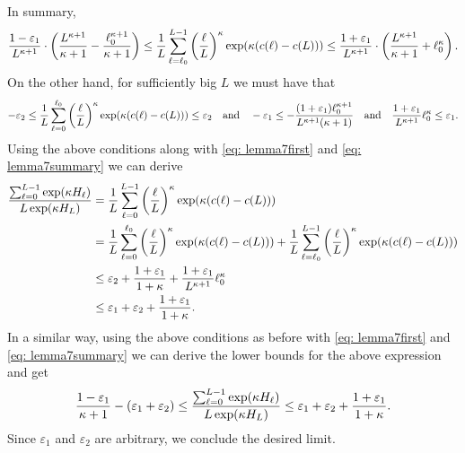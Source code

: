     In summary, 
    \begin{equation}
        \label{eq: lemma7summary}
        \frac{1-\varepsilon_1}{L^{\kappa + 1}} \cdot \left( \frac{L^{\kappa + 1}}{\kappa + 1} - \frac{\ell_0^{\kappa+1}}{\kappa+1} \right) \leq \frac{1}{L} \sum_{\ell= \ell_0}^{L-1} \left(\frac{\ell}{L}\right)^{\kappa} \exp(\kappa (c(\ell)- c(L))) \leq  \frac{1+\varepsilon_1}{L^{\kappa + 1}} \cdot \left( \frac{L^{\kappa + 1}}{\kappa + 1} + \ell_0^{\kappa} \right).
    \end{equation}
    On the other hand, for sufficiently big $L$ we must have that
    \begin{equation*}
        - \varepsilon_2 \leq \frac{1}{L} \sum_{\ell=0}^{\ell_0} \left(\frac{\ell}{L}\right)^{\kappa} \exp(\kappa (c(\ell)- c(L))) \leq \varepsilon_2 \quad \text{and} \quad -\varepsilon_1 \leq -\frac{(1+\varepsilon_1) \ell_0^{\kappa+1}}{L^{\kappa+1}(\kappa+1)} \quad \text{and} \quad \frac{1+\varepsilon_1}{L^{\kappa+1}} \ell_0^{\kappa}\leq \varepsilon_1.
    \end{equation*}
    Using the above conditions along with \eqref{eq: lemma7first} and \eqref{eq: lemma7summary} we can derive
    \begin{align*}
        \frac{\sum_{\ell=0}^{L-1} \exp( \kappa H_{\ell})}{L \exp(\kappa H_L)} &= \frac{1}{L} \sum_{\ell=0}^{L-1} \left(\frac{\ell}{L}\right)^{\kappa} \exp(\kappa (c(\ell)- c(L)))\\
        &=  \frac{1}{L} \sum_{\ell=0}^{\ell_0} \left(\frac{\ell}{L}\right)^{\kappa} \exp(\kappa (c(\ell)- c(L))) +  \frac{1}{L} \sum_{\ell=\ell_0}^{L-1} \left(\frac{\ell}{L}\right)^{\kappa} \exp(\kappa (c(\ell)- c(L)))\\
        &\leq \varepsilon_2 + \frac{1+\varepsilon_1}{1 + \kappa} + \frac{1+\varepsilon_1}{L^{\kappa+1}} \ell_0^{\kappa}\\
        &\leq \varepsilon_1 + \varepsilon_2 + \frac{1+\varepsilon_1}{1+\kappa}.
    \end{align*}
    In a similar way, using the above conditions as before with \eqref{eq: lemma7first} and \eqref{eq: lemma7summary}  we can derive the lower bounds for the above expression and get
    \begin{equation*}
        \frac{1-\varepsilon_1}{\kappa + 1}- (\varepsilon_1 + \varepsilon_2)
        \leq \frac{\sum_{\ell=0}^{L-1} \exp( \kappa H_{\ell})}{L \exp(\kappa H_L)} \leq \varepsilon_1 + \varepsilon_2 + \frac{1+\varepsilon_1}{1+\kappa}.
    \end{equation*}
    Since $\varepsilon_1$ and $\varepsilon_2$ are arbitrary, we conclude the desired limit.
\hfill\Halmos %

